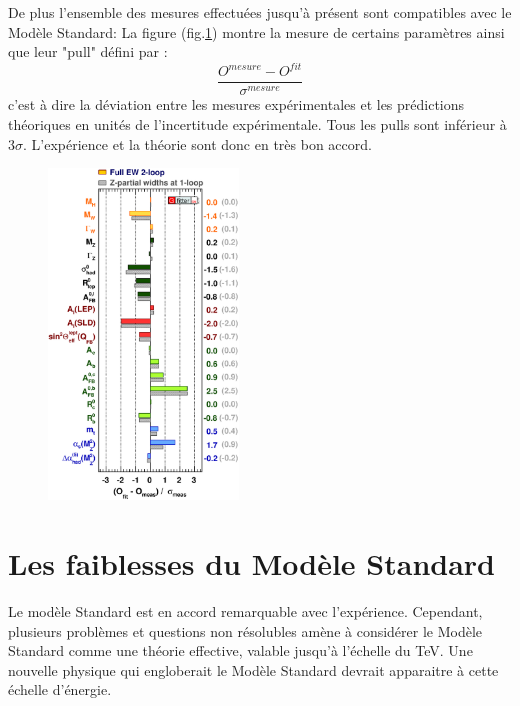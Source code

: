 De plus l'ensemble des mesures effectuées jusqu'à présent sont compatibles avec le Modèle Standard: La figure (fig.\ref{mesures}) montre la mesure de certains paramètres ainsi que leur "pull" défini par :
\begin{equation}
\frac{O^{mesure}-O^{fit}}{\sigma^{mesure}}
\end{equation}
c'est à dire la déviation entre les mesures expérimentales et les prédictions théoriques en unités de l'incertitude expérimentale. Tous les pulls sont inférieur à $3\sigma$. L'expérience et la théorie sont donc en très bon accord.
\begin{figure}[h!]
\centering
\includegraphics[width=0.45\textwidth]{SM/mesure.eps}
\label{mesures}
\end{figure}
\section{Les faiblesses du Modèle Standard}
Le modèle Standard est en accord remarquable avec l'expérience. Cependant, plusieurs problèmes et questions non résolubles amène à considérer le Modèle Standard comme une théorie effective, valable jusqu'à l'échelle du TeV. Une nouvelle physique qui engloberait le Modèle Standard devrait apparaitre à cette échelle d'énergie.

